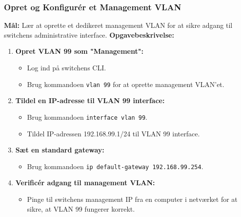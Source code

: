 \subsubsection*{Opret og Konfigurér et Management VLAN}
\textbf{Mål:} Lær at oprette et dedikeret management VLAN for at sikre adgang til switchens administrative interface.
\newline\newline\noindent
\textbf{Opgavebeskrivelse:}
\begin{enumerate}
	\item \textbf{Opret VLAN 99 som "Management":}
	\begin{itemize}
		\item Log ind på switchens CLI.
		\item Brug kommandoen \texttt{vlan 99} for at oprette management VLAN'et.
	\end{itemize}
	\item \textbf{Tildel en IP-adresse til VLAN 99 interface:}
	\begin{itemize}
		\item Brug kommandoen \texttt{interface vlan 99}.
		\item Tildel IP-adressen 192.168.99.1/24 til VLAN 99 interface.
	\end{itemize}
	\item \textbf{Sæt en standard gateway:}
	\begin{itemize}
		\item Brug kommandoen \texttt{ip default-gateway 192.168.99.254}.
	\end{itemize}
	\item \textbf{Verificér adgang til management VLAN:}
	\begin{itemize}
		\item Pinge til switchens management IP fra en computer i netværket for at sikre, at VLAN 99 fungerer korrekt.
	\end{itemize}
\end{enumerate}

